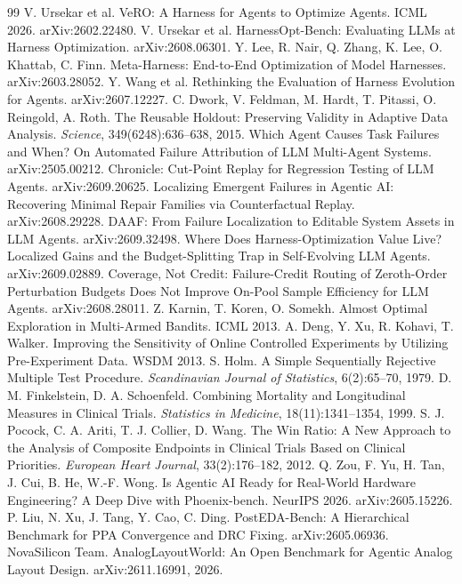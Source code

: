 \documentclass[UTF8,a4paper,10.5pt]{ctexart}
\begin{document}
\begin{thebibliography}{99}\small
{} V. Ursekar et al. VeRO: A Harness for Agents to Optimize Agents. ICML 2026. arXiv:2602.22480.
 V. Ursekar et al. HarnessOpt-Bench: Evaluating LLMs at Harness Optimization. arXiv:2608.06301.
 Y. Lee, R. Nair, Q. Zhang, K. Lee, O. Khattab, C. Finn. Meta-Harness: End-to-End Optimization of Model Harnesses. arXiv:2603.28052.
 Y. Wang et al. Rethinking the Evaluation of Harness Evolution for Agents. arXiv:2607.12227.
 C. Dwork, V. Feldman, M. Hardt, T. Pitassi, O. Reingold, A. Roth. The Reusable Holdout: Preserving Validity in Adaptive Data Analysis. \emph{Science}, 349(6248):636--638, 2015.
 Which Agent Causes Task Failures and When? On Automated Failure Attribution of LLM Multi-Agent Systems. arXiv:2505.00212.
 Chronicle: Cut-Point Replay for Regression Testing of LLM Agents. arXiv:2609.20625.
 Localizing Emergent Failures in Agentic AI: Recovering Minimal Repair Families via Counterfactual Replay. arXiv:2608.29228.
 DAAF: From Failure Localization to Editable System Assets in LLM Agents. arXiv:2609.32498.
 Where Does Harness-Optimization Value Live? Localized Gains and the Budget-Splitting Trap in Self-Evolving LLM Agents. arXiv:2609.02889.
 Coverage, Not Credit: Failure-Credit Routing of Zeroth-Order Perturbation Budgets Does Not Improve On-Pool Sample Efficiency for LLM Agents. arXiv:2608.28011.
 Z. Karnin, T. Koren, O. Somekh. Almost Optimal Exploration in Multi-Armed Bandits. ICML 2013.
 A. Deng, Y. Xu, R. Kohavi, T. Walker. Improving the Sensitivity of Online Controlled Experiments by Utilizing Pre-Experiment Data. WSDM 2013.
 S. Holm. A Simple Sequentially Rejective Multiple Test Procedure. \emph{Scandinavian Journal of Statistics}, 6(2):65--70, 1979.
 D. M. Finkelstein, D. A. Schoenfeld. Combining Mortality and Longitudinal Measures in Clinical Trials. \emph{Statistics in Medicine}, 18(11):1341--1354, 1999.
 S. J. Pocock, C. A. Ariti, T. J. Collier, D. Wang. The Win Ratio: A New Approach to the Analysis of Composite Endpoints in Clinical Trials Based on Clinical Priorities. \emph{European Heart Journal}, 33(2):176--182, 2012.
 Q. Zou, F. Yu, H. Tan, J. Cui, B. He, W.-F. Wong. Is Agentic AI Ready for Real-World Hardware Engineering? A Deep Dive with Phoenix-bench. NeurIPS 2026. arXiv:2605.15226.
 P. Liu, N. Xu, J. Tang, Y. Cao, C. Ding. PostEDA-Bench: A Hierarchical Benchmark for PPA Convergence and DRC Fixing. arXiv:2605.06936.
 NovaSilicon Team. AnalogLayoutWorld: An Open Benchmark for Agentic Analog Layout Design. arXiv:2611.16991, 2026.
\end{thebibliography}
\end{document}
